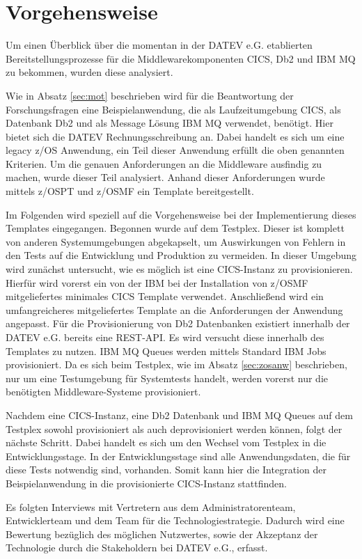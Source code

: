 \chapter{Vorgehensweise}\label{ch:vorgehensweise}
Um einen Überblick über die momentan in der DATEV e.G. etablierten Bereitstellungsprozesse für die Middlewarekomponenten CICS, Db2 und IBM MQ zu bekommen, wurden diese analysiert.

Wie in Absatz \ref{sec:mot} beschrieben wird für die Beantwortung der Forschungsfragen eine Beispielanwendung, die als Laufzeitumgebung CICS, als Datenbank Db2 und als Message Lösung IBM MQ verwendet, benötigt.
Hier bietet sich die \glqq DATEV Rechnungsschreibung\grqq{} an.
Dabei handelt es sich um eine legacy z/OS Anwendung, ein Teil dieser Anwendung erfüllt die oben genannten Kriterien.
Um die genauen Anforderungen an die Middleware ausfindig zu machen, wurde dieser Teil analysiert.
Anhand dieser Anforderungen wurde mittels z/OSPT und z/OSMF ein Template bereitgestellt.

Im Folgenden wird speziell auf die Vorgehensweise bei der Implementierung dieses Templates eingegangen. 
Begonnen wurde auf dem Testplex.
Dieser ist komplett von anderen Systemumgebungen abgekapselt, um Auswirkungen von Fehlern in den Tests auf die Entwicklung und Produktion zu vermeiden.
In dieser Umgebung wird zunächst untersucht, wie es möglich ist eine CICS-Instanz zu provisionieren.
Hierfür wird vorerst ein von der IBM bei der Installation von z/OSMF mitgeliefertes minimales CICS Template verwendet.
Anschließend wird ein umfangreicheres mitgeliefertes Template an die Anforderungen der Anwendung angepasst.
Für die Provisionierung von Db2 Datenbanken existiert innerhalb der DATEV e.G. bereits eine REST-API.
Es wird versucht diese innerhalb des Templates zu nutzen.
IBM MQ Queues werden mittels Standard IBM Jobs provisioniert.
Da es sich beim Testplex, wie im Absatz \ref{sec:zosanw} beschrieben, nur um eine Testumgebung für Systemtests handelt, werden vorerst nur die benötigten Middleware-Systeme provisioniert.

Nachdem eine CICS-Instanz, eine Db2 Datenbank und IBM MQ Queues auf dem Testplex sowohl provisioniert als auch deprovisioniert werden können, folgt der nächste Schritt.
Dabei handelt es sich um den Wechsel vom Testplex in die Entwicklungsstage.
In der Entwicklungsstage sind alle Anwendungsdaten, die für diese Tests notwendig sind, vorhanden.
Somit kann hier die Integration der Beispielanwendung in die provisionierte CICS-Instanz stattfinden.

Es folgten Interviews mit Vertretern aus dem Administratorenteam, Entwicklerteam und dem Team für die Technologiestrategie.
Dadurch wird eine Bewertung bezüglich des möglichen Nutzwertes, sowie der Akzeptanz der Technologie durch die Stakeholdern bei DATEV e.G., erfasst.





